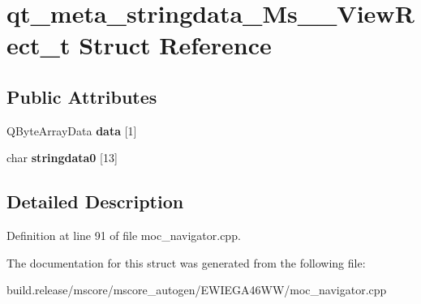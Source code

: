 \hypertarget{structqt__meta__stringdata___ms_____view_rect__t}{}\section{qt\+\_\+meta\+\_\+stringdata\+\_\+\+Ms\+\_\+\+\_\+\+View\+Rect\+\_\+t Struct Reference}
\label{structqt__meta__stringdata___ms_____view_rect__t}
\subsection*{Public Attributes}
\begin{DoxyCompactItemize}
\item 
\mbox{\label{structqt__meta__stringdata___ms_____view_rect__t_a2183f714706e8544c509275d8716fa3d}} 
Q\+Byte\+Array\+Data {\bfseries data} \mbox{[}1\mbox{]}
\item 
\mbox{\label{structqt__meta__stringdata___ms_____view_rect__t_a480679c063b928c9c6f77db5a61bf87b}} 
char {\bfseries stringdata0} \mbox{[}13\mbox{]}
\end{DoxyCompactItemize}


\subsection{Detailed Description}


Definition at line 91 of file moc\+\_\+navigator.\+cpp.



The documentation for this struct was generated from the following file\+:\begin{DoxyCompactItemize}
\item 
build.\+release/mscore/mscore\+\_\+autogen/\+E\+W\+I\+E\+G\+A46\+W\+W/moc\+\_\+navigator.\+cpp\end{DoxyCompactItemize}
